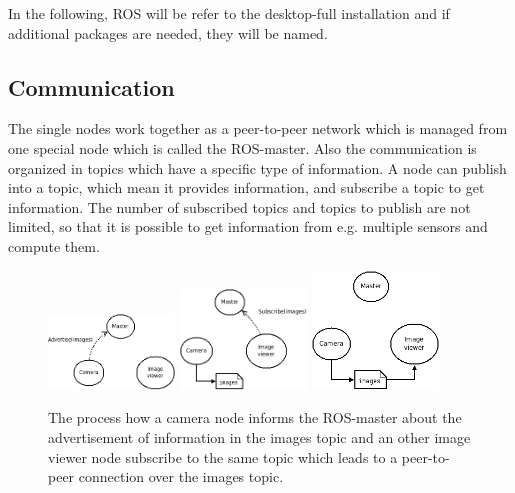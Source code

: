 In the following, \ac{ROS} will be refer to the desktop-full installation and if additional packages are needed, they will be named.

\subsection{Communication}\label{ssec:communication}

The single nodes work together as a peer-to-peer network which is managed from one special node which is called the ROS-master.
Also the communication is organized in topics which have a specific type of information.
A node can publish into a topic, which mean it provides information, and subscribe a topic to get information.
The number of subscribed topics and topics to publish are not limited, so that it is possible to get information from e.g. multiple sensors and compute them.

\begin{figure}[ht]
    \centering
    \includegraphics[width=0.30\textwidth]{img/ros_master/ros_master1.png}
    \includegraphics[width=0.30\textwidth]{img/ros_master/ros_master2.png}
    \includegraphics[width=0.30\textwidth]{img/ros_master/ros_master3.png}
    \caption{The process how a camera node informs the ROS-master about the advertisement of information in the images topic and an other image viewer node subscribe to the same topic which leads to a peer-to-peer connection over the images topic.}\label{fig:ros_master}
\end{figure}

